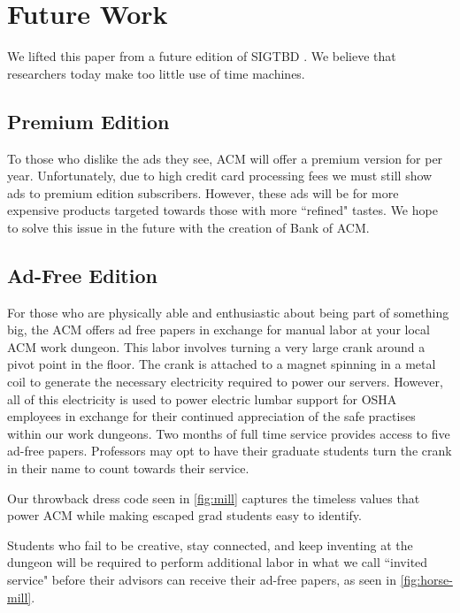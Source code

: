 \section{Future Work}
We lifted this paper from a future edition of SIGTBD .
We believe that researchers today make too little use of time machines.


\subsection{Premium Edition}
To those who dislike the ads they see, ACM will offer a premium version for
 per year.
Unfortunately, due to high credit card processing fees we must still show ads
to premium edition subscribers.
However, these ads will be for more expensive products targeted towards those
with more ``refined" tastes.
We hope to solve this issue in the future with the creation of Bank of ACM.

\subsection{Ad-Free Edition}
For those who are physically able and enthusiastic about being part of
something big, the ACM offers ad free papers in exchange for manual labor at
your local ACM work dungeon.
This labor involves turning a very large crank around a pivot point in the
floor.
The crank is attached to a magnet spinning in a metal coil to generate the
necessary electricity required to power our servers.
However, all of this electricity is used to power electric lumbar support for
OSHA employees in exchange for their continued appreciation of the safe
practises within our work dungeons.
Two months of full time service provides access to five ad-free papers.
Professors may opt to have their graduate students turn the crank in their name
to count towards their service.

Our throwback dress code seen in \autoref{fig:mill} captures the timeless
values that power ACM while making escaped grad students easy to identify.

Students who fail to be creative, stay connected, and keep inventing at the
dungeon will be required to perform additional labor in what we call ``invited
service" before their advisors can receive their ad-free papers, as seen in
\autoref{fig:horse-mill}.

